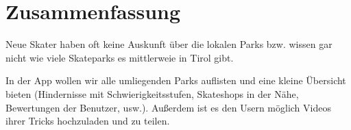 \section*{Zusammenfassung}

Neue Skater haben oft keine Auskunft über die lokalen Parks bzw. wissen gar nicht wie viele
Skateparks es mittlerweie in Tirol gibt.





In der App wollen wir alle umliegenden Parks auflisten und eine kleine
Übersicht bieten (Hindernisse mit Schwierigkeitsstufen, Skateshops in der Nähe, Bewertungen der
Benutzer, usw.). Außerdem ist es den Usern möglich Videos ihrer Tricks hochzuladen und zu teilen.

\newpage